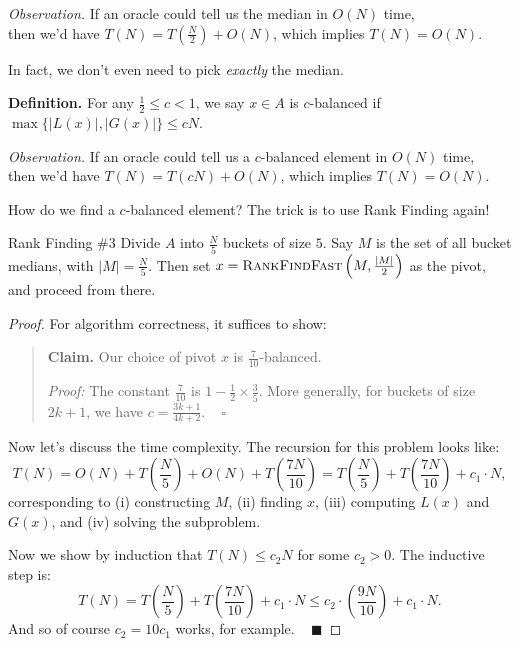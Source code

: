 \begin{boxed-text}[32em]
    \emph{Observation.} If an oracle could tell us the median in $O(N)$ time, \\ then we'd have $T(N) = T\left(\frac{N}{2}\right) + O(N)$, which implies $T(N) = O(N)$.
\end{boxed-text}

In fact, we don't even need to pick \emph{exactly} the median.

\textbf{Definition.} For any $\frac{1}{2} \leq c < 1$, we say $x \in A$ is $c$-balanced if $\max \{ |L(x)|, |G(x)|\} \leq cN$.

\begin{boxed-text}[32em]
    \emph{Observation.} If an oracle could tell us a $c$-balanced element in $O(N)$ time, \\ then we'd have $T(N) = T\left(cN\right) + O(N)$, which implies $T(N) = O(N)$.
\end{boxed-text}

How do we find a $c$-balanced element?  The trick is to use Rank Finding again!

\begin{solution}{Rank Finding \#3}
    Divide $A$ into $\frac{N}{5}$ buckets of size $5$.  Say $M$ is the set of all bucket medians, with $|M| = \frac{N}{5}$.  Then set $x = \textsc{RankFindFast}\left(M, \frac{|M|}{2}\right)$ as the pivot, and proceed from there.
\end{solution}

\begin{proof}
    For algorithm correctness, it suffices to show:
    \begin{quote}
        \textbf{Claim.} Our choice of pivot $x$ is $\frac{7}{10}$-balanced.

        \emph{Proof:} The constant $\frac{7}{10}$ is $1 - \frac{1}{2} \times \frac{3}{5}$.  More generally, for buckets of size $2k + 1$, we have $c = \frac{3k + 1}{4k + 2}$.  ~ $\square$
    \end{quote}
    
    Now let's discuss the time complexity.  The recursion for this problem looks like:
    \[ T(N) = O(N) + T\left(\frac{N}{5}\right) + O(N) + T\left(\frac{7N}{10}\right) = T\left(\frac{N}{5}\right) + T\left(\frac{7N}{10}\right) + c_1 \cdot N, \]
    corresponding to (i) constructing $M$, (ii) finding $x$, (iii) computing $L(x)$ and $G(x)$, and (iv) solving the subproblem.

    Now we show by induction that $T(N) \leq c_2N$ for some $c_2 > 0$.  The inductive step is:
    \[ T(N) = T\left(\frac{N}{5}\right) + T\left(\frac{7N}{10}\right) + c_1 \cdot N \leq c_2 \cdot \left(\frac{9N}{10}\right) + c_1 \cdot N. \]
    And so of course $c_2 = 10c_1$ works, for example. ~ $\blacksquare$
\end{proof}

